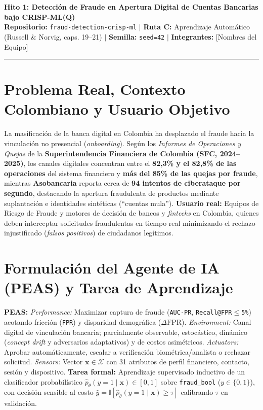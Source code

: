 \documentclass[9pt,letterpaper]{article}
\begin{document}
\begin{center}
    {\Large \textbf{Hito 1: Detección de Fraude en Apertura Digital de Cuentas Bancarias bajo CRISP-ML(Q)}}\\[2pt]
    {\footnotesize \textbf{Repositorio:} \texttt{fraud-detection-crisp-ml} $|$ \textbf{Ruta C:} Aprendizaje Automático (Russell \& Norvig, caps. 19--21) $|$ \textbf{Semilla:} \texttt{seed=42} $|$ \textbf{Integrantes:} [Nombres del Equipo]}
\end{center}
\vspace{-4pt}
\hrule
\vspace{3pt}

\section{Problema Real, Contexto Colombiano y Usuario Objetivo}
La masificación de la banca digital en Colombia ha desplazado el fraude hacia la vinculación no presencial (\textit{onboarding}). Según los \textit{Informes de Operaciones y Quejas} de la \textbf{Superintendencia Financiera de Colombia (SFC, 2024--2025)}, los canales digitales concentran entre el \textbf{82,3\% y el 82,8\% de las operaciones} del sistema financiero y \textbf{más del 85\% de las quejas por fraude}, mientras \textbf{Asobancaria} reporta cerca de \textbf{94 intentos de ciberataque por segundo}, destacando la apertura fraudulenta de productos mediante suplantación e identidades sintéticas (``cuentas mula''). \textbf{Usuario real:} Equipos de Riesgo de Fraude y motores de decisión de bancos y \textit{fintechs} en Colombia, quienes deben interceptar solicitudes fraudulentas en tiempo real minimizando el rechazo injustificado (\textit{falsos positivos}) de ciudadanos legítimos.

\section{Formulación del Agente de IA (PEAS) y Tarea de Aprendizaje}
\textbf{PEAS:} \textit{Performance:} Maximizar captura de fraude (\texttt{AUC-PR}, \texttt{Recall@FPR$\le$5\%}) acotando fricción (\texttt{FPR}) y disparidad demográfica ($\Delta\text{FPR}$). \textit{Environment:} Canal digital de vinculación bancaria; parcialmente observable, estocástico, dinámico (\textit{concept drift} y adversarios adaptativos) y de costos asimétricos. \textit{Actuators:} Aprobar automáticamente, escalar a verificación biométrica/analista o rechazar solicitud. \textit{Sensors:} Vector $\mathbf{x} \in \mathcal{X}$ con 31 atributos de perfil financiero, contacto, sesión y dispositivo. \textbf{Tarea formal:} Aprendizaje supervisado inductivo de un clasificador probabilístico $\hat{p}_\theta(y=1\mid\mathbf{x})\in[0,1]$ sobre \texttt{fraud\_bool} ($y\in\{0,1\}$), con decisión sensible al costo $\hat{y}=\mathbb{I}[\hat{p}_\theta(y=1\mid\mathbf{x})\ge\tau]$ calibrando $\tau$ en validación.
\end{document}
